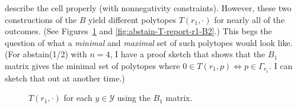 \documentclass[12pt]{article}
\newcommand{\Y}{\mathcal{Y}}
\begin{document}
describe the cell properly (with nonnegativity constraints).
However, these two constructions of the $B$ yield different polytopes $T(r_1, \cdot)$ for nearly all of the outcomes. (See Figures~\ref{fig:abstain-T-report-r1-B1} and \ref{fig:abstain-T-report-r1-B2}.)
This begs the question of what a \emph{minimal} and \emph{maximal} set of such polytopes would look like.
(For abstain(1/2) with $n=4$, I have a proof sketch that shows that the $B_1$ matrix gives the minimal set of polytopes where $0 \in T(r_1, p) \iff p \in \Gamma_{r_1}$.
I can sketch that out at another time.)


\begin{figure}
\begin{minipage}{0.24\linewidth}
\end{minipage}
\begin{minipage}{0.24\linewidth}
\end{minipage}
\begin{minipage}{0.24\linewidth}
\end{minipage}
\begin{minipage}{0.24\linewidth}
\end{minipage}
\caption{$T(r_1, \cdot)$ for each $y \in \Y$ using the $B_1$ matrix.}
\label{fig:abstain-T-report-r1-B1}
\end{figure}
\end{document}
